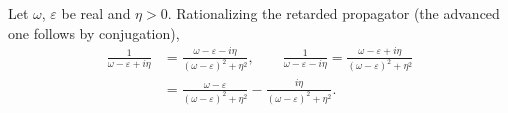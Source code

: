\documentclass{article}
\begin{document}
Let $\omega$, $\varepsilon$ be real and $\eta>0$. Rationalizing the retarded propagator (the advanced one follows by conjugation),
\begin{align}
\frac{1}{\omega-\varepsilon+i\eta} &= \frac{\omega-\varepsilon-i\eta}{(\omega-\varepsilon)^2+\eta^2}, \qquad
\frac{1}{\omega-\varepsilon-i\eta} = \frac{\omega-\varepsilon+i\eta}{(\omega-\varepsilon)^2+\eta^2} \nonumber\\
&= \frac{\omega-\varepsilon}{(\omega-\varepsilon)^2+\eta^2} - \frac{i\eta}{(\omega-\varepsilon)^2+\eta^2} .
\label{eq:rat}
\end{align}
\end{document}
